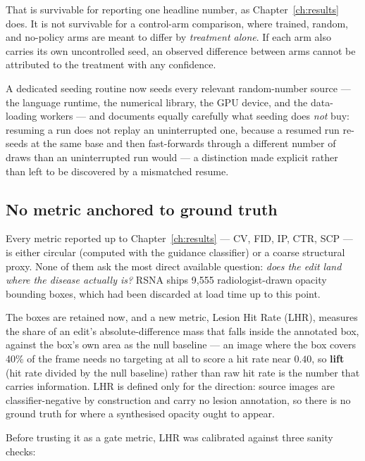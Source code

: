 That is survivable for reporting one headline number, as
Chapter~\ref{ch:results} does. It is not survivable for a control-arm
comparison, where trained, random, and no-policy arms are meant to differ
by \emph{treatment alone}. If each arm also carries its own uncontrolled
seed, an observed difference between arms cannot be attributed to the
treatment with any confidence.

A dedicated seeding routine now seeds every relevant random-number
source --- the language runtime, the numerical library, the GPU device,
and the data-loading workers --- and documents equally carefully what
seeding does \emph{not} buy: resuming a run does not replay an
uninterrupted one, because a resumed run re-seeds at the same base and
then fast-forwards through a different number of draws than an
uninterrupted run would --- a distinction made explicit rather than left
to be discovered by a mismatched resume.

\subsection{No metric anchored to ground truth}
\label{sec:lhr}

Every metric reported up to Chapter~\ref{ch:results} --- CV, FID, IP, CTR,
SCP --- is either circular (computed with the guidance classifier) or a
coarse structural proxy. None of them ask the most direct available
question: \emph{does the edit land where the disease actually is?} RSNA
ships 9{,}555 radiologist-drawn opacity bounding boxes, which had been
discarded at load time up to this point.

The boxes are retained now, and a new metric, Lesion Hit Rate (LHR),
measures the share of an edit's absolute-difference mass that falls
inside the annotated box, against the box's own area as the null
baseline --- an image where the box covers 40\% of the frame needs no
targeting at all to score a hit rate near $0.40$, so \textbf{lift} (hit
rate divided by the null baseline) rather than raw hit rate is the number
that carries information. LHR is defined only for the \pton{} direction:
\ntop{} source images are classifier-negative by construction and carry
no lesion annotation, so there is no ground truth for where a synthesised
opacity ought to appear.

Before trusting it as a gate metric, LHR was calibrated against three
sanity checks:

